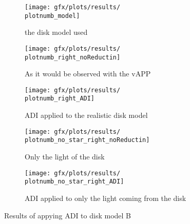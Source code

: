 \begin{figure}[h!]
  \newcommand{\plotnumb}{1}
  \begin{subfigure}[b]{0.6\textwidth}
    \texttt{[image: gfx/plots/results/\\plotnumb\_model]}
    \caption{the disk model used}
  \end{subfigure}
  
  \begin{subfigure}[b]{0.6\textwidth}
    \texttt{[image: gfx/plots/results/\\plotnumb\_right\_noReductin]}
    \caption{As it would be observed with the \ac{vAPP}}
  \end{subfigure}%
  \begin{subfigure}[b]{0.6\textwidth}
    \texttt{[image: gfx/plots/results/\\plotnumb\_right\_ADI]}
    \caption{\ac{ADI} applied to the realistic disk model}
  \end{subfigure}
  
  \begin{subfigure}[t]{0.6\textwidth}
    \centering
    \texttt{[image: gfx/plots/results/\\plotnumb\_no\_star\_right\_noReductin]}
    \caption{Only the light of the disk}
  \end{subfigure}%
  \begin{subfigure}[t]{0.6\textwidth}
    \centering
    \texttt{[image: gfx/plots/results/\\plotnumb\_no\_star\_right\_ADI]}
    \caption{\ac{ADI} applied to only the light coming from the disk}
  \end{subfigure}


  \caption{Results of appying \ac{ADI} to disk model B}
  \label{fig:B}
\end{figure}

